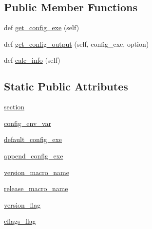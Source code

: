 \subsection*{Public Member Functions}
\begin{DoxyCompactItemize}
\item 
def \hyperlink{classnumpy_1_1distutils_1_1system__info_1_1__pkg__config__info_a45e370c3b6836478cb725e1f736be044}{get\+\_\+config\+\_\+exe} (self)
\item 
def \hyperlink{classnumpy_1_1distutils_1_1system__info_1_1__pkg__config__info_a456c7ca725bb628be2e600fef72626ad}{get\+\_\+config\+\_\+output} (self, config\+\_\+exe, option)
\item 
def \hyperlink{classnumpy_1_1distutils_1_1system__info_1_1__pkg__config__info_abafba9b1dc16541e8a77497af955eafb}{calc\+\_\+info} (self)
\end{DoxyCompactItemize}
\subsection*{Static Public Attributes}
\begin{DoxyCompactItemize}
\item 
\hyperlink{classnumpy_1_1distutils_1_1system__info_1_1__pkg__config__info_a93cc59fa58adf20cf243a9b2b8c952dc}{section}
\item 
\hyperlink{classnumpy_1_1distutils_1_1system__info_1_1__pkg__config__info_a2f57d71d473f303b030bc3ba6ac0bf31}{config\+\_\+env\+\_\+var}
\item 
\hyperlink{classnumpy_1_1distutils_1_1system__info_1_1__pkg__config__info_aa8d5423025228ef5081e1721842614c4}{default\+\_\+config\+\_\+exe}
\item 
\hyperlink{classnumpy_1_1distutils_1_1system__info_1_1__pkg__config__info_a1dfc8a1f299bc557eeec2637c6d51386}{append\+\_\+config\+\_\+exe}
\item 
\hyperlink{classnumpy_1_1distutils_1_1system__info_1_1__pkg__config__info_ad10760704d15ec1672f6eb633e90ef85}{version\+\_\+macro\+\_\+name}
\item 
\hyperlink{classnumpy_1_1distutils_1_1system__info_1_1__pkg__config__info_a8b9fcaf5e176884c2b0576016772ef10}{release\+\_\+macro\+\_\+name}
\item 
\hyperlink{classnumpy_1_1distutils_1_1system__info_1_1__pkg__config__info_ac61d9d0fbe97b9c742cf61b7aabe941a}{version\+\_\+flag}
\item 
\hyperlink{classnumpy_1_1distutils_1_1system__info_1_1__pkg__config__info_a6af3c0144a3dc707ba816a80e9dc2550}{cflags\+\_\+flag}
\end{DoxyCompactItemize}
